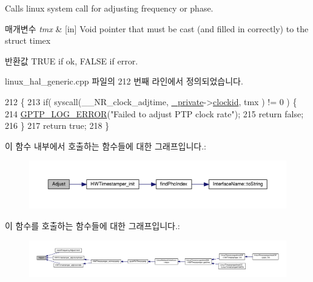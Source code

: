 Calls linux system call for adjusting frequency or phase. 


\begin{DoxyParams}{매개변수}
{\em tmx} & \mbox{[}in\mbox{]} Void pointer that must be cast (and filled in correctly) to the struct timex \\
\hline
\end{DoxyParams}
\begin{DoxyReturn}{반환값}
T\+R\+UE if ok, F\+A\+L\+SE if error. 
\end{DoxyReturn}


linux\+\_\+hal\+\_\+generic.\+cpp 파일의 212 번째 라인에서 정의되었습니다.


\begin{DoxyCode}
212                                                       \{
213     \textcolor{keywordflow}{if}( syscall(\_\_NR\_clock\_adjtime, \hyperlink{class_linux_timestamper_generic_a5522acc6ce53752665fa393702058a7b}{\_private}->\hyperlink{struct_linux_timestamper_generic_private_a4f74a0f0dc6605cf35e80f22e678c831}{clockid}, tmx ) != 0 ) \{
214         \hyperlink{gptp__log_8hpp_afefbb1009717c128012bfeed94842987}{GPTP\_LOG\_ERROR}(\textcolor{stringliteral}{"Failed to adjust PTP clock rate"});
215         \textcolor{keywordflow}{return} \textcolor{keyword}{false};
216     \}
217     \textcolor{keywordflow}{return} \textcolor{keyword}{true};
218 \}
\end{DoxyCode}


이 함수 내부에서 호출하는 함수들에 대한 그래프입니다.\+:
\nopagebreak
\begin{figure}[H]
\begin{center}
\leavevmode
\includegraphics[width=350pt]{class_linux_timestamper_generic_a1d52a5a84b74222b880522cee01475e1_cgraph}
\end{center}
\end{figure}




이 함수를 호출하는 함수들에 대한 그래프입니다.\+:
\nopagebreak
\begin{figure}[H]
\begin{center}
\leavevmode
\includegraphics[width=350pt]{class_linux_timestamper_generic_a1d52a5a84b74222b880522cee01475e1_icgraph}
\end{center}
\end{figure}


